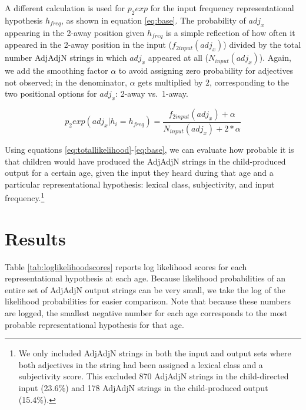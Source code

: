 \documentclass[10pt]{article}
\newcommand{\gcs}[1]{\textcolor{blue}{[gcs: #1]}}
\newcommand{\gkb}[1]{\textcolor{magenta}{[gkb: #1]}}
\newcommand{\lsp}[1]{\textcolor{violet}{[lsp: #1]}}
\begin{document}
A different calculation is used for $p_2exp$ for the input frequency representational hypothesis $h_{freq}$, as shown in equation \eqref{eq:base}. 
The probability of $adj_x$ appearing in the 2-away position given $h_{freq}$ is a simple reflection of how often it appeared in the 2-away position in the input ($f_{2input}(adj_x)$) divided by the total number AdjAdjN strings in which $adj_x$ appeared at all ($N_{input}(adj_x)$). Again, we add the smoothing factor $\alpha$ to avoid assigning zero probability for adjectives not observed; in the denominator, $\alpha$ gets multiplied by $2$, corresponding to the two positional options for $adj_x$: 2-away vs.~1-away.

\begin{equation}
\label{eq:base}
p_2exp(adj_x|h_i=h_{freq}) = \frac{f_{2input}(adj_x)+\alpha}{N_{input}(adj_x)+2*\alpha}
\end{equation}

Using equations \eqref{eq:totallikelihood}-\eqref{eq:base}, we can evaluate how probable it is that children would have produced the AdjAdjN strings in the child-produced output for a certain age, given the input they heard during that age and a particular representational hypothesis: lexical class, subjectivity, and input frequency.\footnote{We only included AdjAdjN strings in both the input and output sets where both adjectives in the string had been assigned a lexical class and a subjectivity score. This excluded 870 AdjAdjN strings in the child-directed input (23.6\%) and 178 AdjAdjN strings in the child-produced output (15.4\%). %
}




\section{Results}




Table \ref{tab:loglikelihoodscores} reports log likelihood scores for each representational hypothesis at each age. Because likelihood probabilities of an entire set of AdjAdjN output strings can be very small, we take the log of the likelihood probabilities for easier comparison. %
Note that because these numbers are logged, the smallest negative number for each age corresponds to the most probable representational hypothesis for that age. %
\end{document}
